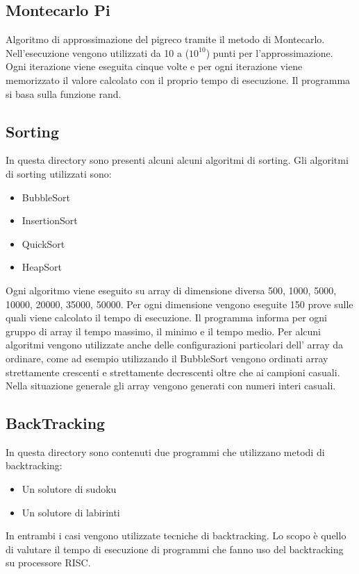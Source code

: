 \documentclass[12pt,a4paper]{report}
\begin{document}
\subsection{Montecarlo Pi}
Algoritmo di approssimazione del pigreco tramite il metodo di Montecarlo. Nell'esecuzione vengono utilizzati da 10 a ($ 10^{10} $) punti per l'approssimazione. Ogni iterazione viene eseguita cinque volte e per ogni iterazione viene memorizzato il valore calcolato con il proprio tempo di esecuzione. Il programma si basa sulla funzione rand.

\subsection{Sorting}
In questa directory sono presenti alcuni alcuni algoritmi di sorting. Gli algoritmi di sorting utilizzati sono:
\begin{itemize}
	\item BubbleSort
	\item InsertionSort
	\item QuickSort
	\item HeapSort
\end{itemize}

Ogni algoritmo viene eseguito su array di dimensione diversa 500, 1000, 5000, 10000, 20000, 35000, 50000. Per ogni dimensione vengono eseguite 150 prove sulle quali viene calcolato il tempo di esecuzione. Il programma informa per ogni gruppo di array il tempo massimo, il minimo e il tempo medio. Per alcuni algoritmi vengono utilizzate anche delle configurazioni particolari dell' array da ordinare, come ad esempio utilizzando il BubbleSort vengono ordinati array strettamente crescenti e strettamente decrescenti oltre che ai campioni casuali. Nella situazione generale gli array vengono generati con numeri interi casuali.

\subsection{BackTracking}
In questa directory sono contenuti due programmi che utilizzano metodi di backtracking:
\begin{itemize}
	\item Un solutore di sudoku
	\item Un solutore di labirinti
\end{itemize}

In entrambi i casi vengono utilizzate tecniche di backtracking.  Lo scopo è quello di valutare il tempo di esecuzione di programmi che fanno uso del backtracking su processore RISC.
\end{document}
